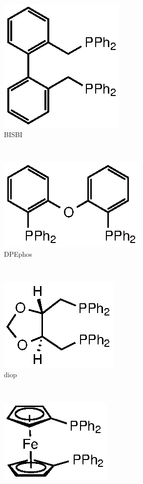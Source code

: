 \begin{figure}[htbp]
~
\begin{subfigure}[b]{0.3\textwidth}
	\centering
	\includegraphics{../Figures/Diphosphines/BISBI.eps}
	\caption{BISBI}
	\label{BISBI}
\end{subfigure}
~
\begin{subfigure}[b]{0.3\textwidth}
	\centering
	\includegraphics{../Figures/Xantphosderivatives/DPEphos.eps}
	\caption{DPEphos}
	\label{DPEphos}
\end{subfigure}
\\
\vspace{0.5cm}
\begin{subfigure}[b]{0.3\textwidth}
	\centering
	\includegraphics{../Figures/Diphosphines/DIOP.eps}
	\caption{diop}
	\label{diop}
\end{subfigure}
~
\begin{subfigure}[b]{0.3\textwidth}
	\centering
	\includegraphics{../Figures/Diphosphines/dppf.eps}

\end{subfigure}
\end{figure}
